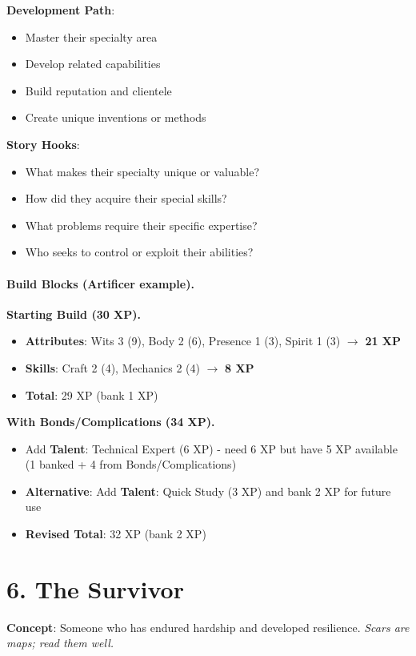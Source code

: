 \textbf{Development Path}:
\begin{itemize}
\item Master their specialty area
\item Develop related capabilities
\item Build reputation and clientele
\item Create unique inventions or methods
\end{itemize}

\textbf{Story Hooks}:
\begin{itemize}
\item What makes their specialty unique or valuable?
\item How did they acquire their special skills?
\item What problems require their specific expertise?
\item Who seeks to control or exploit their abilities?
\end{itemize}

\paragraph{Build Blocks (Artificer example).}
\textbf{Starting Build (30 XP).}
\begin{itemize}
\item \textbf{Attributes}: Wits 3 (9), Body 2 (6), Presence 1 (3), Spirit 1 (3) $\rightarrow$ \textbf{21 XP}
\item \textbf{Skills}: Craft 2 (4), Mechanics 2 (4) $\rightarrow$ \textbf{8 XP}
\item \textbf{Total}: 29 XP (bank 1 XP)
\end{itemize}
\textbf{With Bonds/Complications (34 XP).}
\begin{itemize}
\item Add \textbf{Talent}: Technical Expert (6 XP) - need 6 XP but have 5 XP available (1 banked + 4 from Bonds/Complications)
\item \textbf{Alternative}: Add \textbf{Talent}: Quick Study (3 XP) and bank 2 XP for future use
\item \textbf{Revised Total}: 32 XP (bank 2 XP)
\end{itemize}

\section{6. The Survivor}

\textbf{Concept}: Someone who has endured hardship and developed resilience. \emph{Scars are maps; read them well.}

